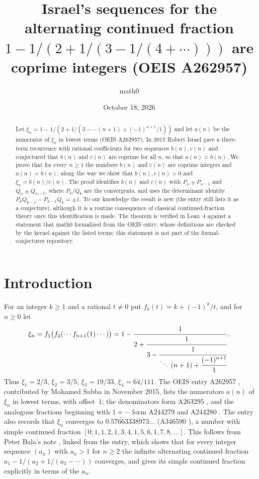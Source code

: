 \documentclass[11pt]{amsart}
\title[Israel's conjecture for OEIS A262957]{Israel's sequences for the alternating continued fraction $1-1/(2+1/(3-1/(4+\cdots)))$ are coprime integers (OEIS A262957)}
\author{math0}
\date{October 18, 2026}
\theoremstyle{plain}
\theoremstyle{definition}
\begin{document}
\begin{abstract}
Let $\xi_n=1-1/(2+1/(3-\cdots(n+1)+(-1)^{n+1}/1))$ and let $a(n)$ be the numerator of $\xi_n$ in lowest terms (OEIS A262957). In 2015 Robert Israel gave a three-term recurrence with rational coefficients for two sequences $b(n),c(n)$ and conjectured that $b(n)$ and $c(n)$ are coprime for all $n$, so that $a(n)=b(n)$. We prove that for every $n\ge1$ the numbers $b(n)$ and $c(n)$ are coprime integers and $a(n)=b(n)$; along the way we show that $b(n),c(n)>0$ and $\xi_n=b(n)/c(n)$. The proof identifies $b(n)$ and $c(n)$ with $P_n\pm P_{n-1}$ and $Q_n\pm Q_{n-1}$, where $P_k/Q_k$ are the convergents, and uses the determinant identity $P_kQ_{k-1}-P_{k-1}Q_k=\pm1$. To our knowledge the result is new (the entry still lists it as a conjecture), although it is a routine consequence of classical continued-fraction theory once this identification is made. The theorem is verified in Lean~4 against a statement that math0 formalized from the OEIS entry, whose definitions are checked by the kernel against the listed terms; this statement is not part of the formal-conjectures repository.
\end{abstract}
\maketitle

\section{Introduction}

For an integer $k\ge1$ and a rational $t\ne0$ put $f_k(t)=k+(-1)^k/t$, and for $n\ge0$ let
\[
  \xi_n=f_1\bigl(f_2(\cdots f_{n+1}(1)\cdots)\bigr)
  =1-\cfrac{1}{2+\cfrac{1}{3-\cfrac{1}{\ddots\;(n+1)+\cfrac{(-1)^{n+1}}{1}}}}\,.
\]
Thus $\xi_1=2/3$, $\xi_2=3/5$, $\xi_3=19/33$, $\xi_4=64/111$.
The OEIS entry A262957 \cite{A262957}, contributed by Mohamed Sabba in November 2015, lists the numerators $a(n)$ of $\xi_n$ in lowest terms, with offset~$1$; the denominators form A263295 \cite{A263295}, and the analogous fractions beginning with $1+\cdots$ form A244279 and A244280 \cite{A244279,A244280}.
The entry also records that $\xi_n$ converges to $0.57663338973\ldots$ (A346590 \cite{A346590}), a number with simple continued fraction $[0;1,1,2,1,3,4,1,5,6,1,7,8,\dots]$. This follows from Peter Bala's note \cite{Bala}, linked from the entry, which shows that for every integer sequence $(a_n)$ with $a_n>1$ for $n\ge2$ the infinite alternating continued fraction $a_1-1/(a_2+1/(a_3-\cdots))$ converges, and gives its simple continued fraction explicitly in terms of the $a_n$.
\end{document}
